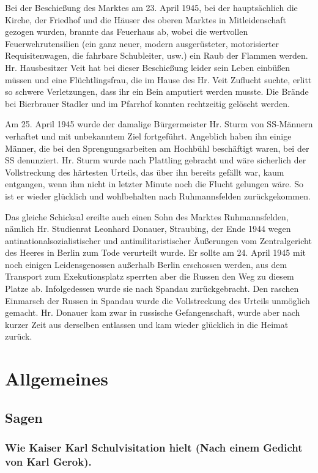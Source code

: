 \documentclass[12pt,a4pager]{book}
\begin{document}
Bei der Beschießung des Marktes am 23. April 1945, bei der hauptsächlich die
Kirche, der Friedhof und die Häuser des oberen Marktes in Mitleidenschaft
gezogen wurden, brannte das Feuerhaus ab, wobei die wertvollen
Feuerwehrutensilien (ein ganz neuer, modern ausgerüsteter, motorisierter
Requisitenwagen, die fahrbare Schubleiter, usw.) ein Raub der Flammen werden.
Hr. Hausbesitzer Veit hat bei dieser Beschießung leider sein Leben einbüßen
müssen und eine Flüchtlingsfrau, die im Hause des Hr. Veit Zuflucht suchte,
erlitt so schwere Verletzungen, dass ihr ein Bein amputiert werden musste. Die
Brände bei Bierbrauer Stadler und im Pfarrhof konnten rechtzeitig gelöscht
werden.

Am 25. April 1945 wurde der damalige Bürgermeister Hr. Sturm von SS-Männern
verhaftet und mit unbekanntem Ziel fortgeführt. Angeblich haben ihn einige
Männer, die bei den Sprengungsarbeiten am Hochbühl beschäftigt waren, bei der SS
denunziert. Hr. Sturm wurde nach Plattling gebracht und wäre sicherlich der
Vollstreckung des härtesten Urteils, das über ihn bereits gefällt war, kaum
entgangen, wenn ihm nicht in letzter Minute noch die Flucht gelungen wäre. So
ist er wieder glücklich und wohlbehalten nach Ruhmannsfelden zurückgekommen.

Das gleiche Schicksal ereilte auch einen Sohn des Marktes Ruhmannsfelden,
nämlich Hr. Studienrat Leonhard Donauer, Straubing, der Ende 1944 wegen
antinationalsozialistischer und antimilitaristischer Äußerungen vom
Zentralgericht des Heeres in Berlin zum Tode verurteilt wurde. Er sollte am 24.
April 1945 mit noch einigen Leidensgenossen außerhalb Berlin erschossen werden,
aus dem Transport zum Exekutionsplatz sperrten aber die Russen den Weg zu diesem
Platze ab. Infolgedessen wurde sie nach Spandau zurückgebracht. Den raschen
Einmarsch der Russen in Spandau wurde die Vollstreckung des Urteils unmöglich
gemacht. Hr. Donauer kam zwar in russische Gefangenschaft, wurde aber nach
kurzer Zeit aus derselben entlassen und kam wieder glücklich in die Heimat
zurück.

\part{Allgemeines}

\chapter{Sagen}

\section{Wie Kaiser Karl Schulvisitation hielt (Nach einem Gedicht von Karl
Gerok).}
\end{document}
